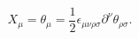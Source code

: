 \begin{equation}
X_\mu=\theta_\mu=\frac{1}{2}\epsilon_{\mu\nu\rho\sigma}\partial^\nu\theta_{\rho\sigma}.
\label{3.6}
\end{equation}

